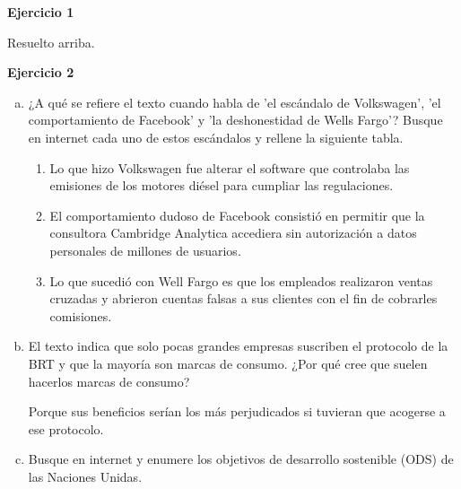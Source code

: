 \documentclass[12pt]{article}
\theoremstyle{definition}
\theoremstyle{remark}
\begin{document}


\newpage

\textbf{Ejercicio 1}

Resuelto arriba.

\textbf{Ejercicio 2}

\begin{enumerate}[a)]

\item ¿A qué se refiere el texto cuando habla de 'el escándalo de Volkswagen', 'el comportamiento de Facebook' y 'la deshonestidad de Wells Fargo'? Busque en internet cada uno de estos escándalos y rellene la siguiente tabla.

\begin{enumerate}[*]

\item Lo que hizo Volkswagen fue alterar el software que controlaba las emisiones de los motores diésel para cumpliar las regulaciones.
\item El comportamiento dudoso de Facebook consistió en permitir que la consultora Cambridge Analytica accediera sin autorización a datos personales de millones de usuarios.
\item Lo que sucedió con Well Fargo es que los empleados realizaron ventas cruzadas y abrieron cuentas falsas a sus clientes con el fin de cobrarles comisiones.
\end{enumerate}

\item El texto indica que solo pocas grandes empresas suscriben el protocolo de la BRT y que la mayoría son marcas de consumo. ¿Por qué cree que suelen hacerlos marcas de consumo?

Porque sus beneficios serían los más perjudicados si tuvieran que acogerse a ese protocolo.

\item Busque en internet y enumere los objetivos de desarrollo sostenible (ODS) de las Naciones Unidas.


\end{enumerate}
\end{document}
